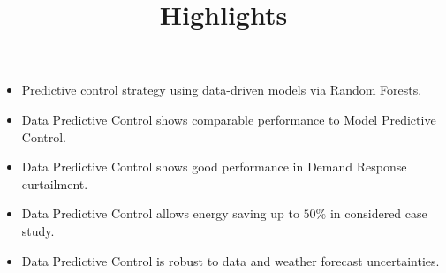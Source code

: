 \documentclass[12pt]{article}
\begin{document}
\title{Highlights}
\date{}
\maketitle 
\thispagestyle{empty}

\begin{itemize}
	\item Predictive control strategy using data-driven models via Random Forests.
	\item Data Predictive Control shows comparable performance to Model Predictive Control.
	\item Data Predictive Control shows good performance in Demand Response curtailment.
	\item Data Predictive Control allows energy saving up to $50\%$ in considered case study.
	\item Data Predictive Control is robust to data and weather forecast uncertainties.
\end{itemize}
\end{document}
